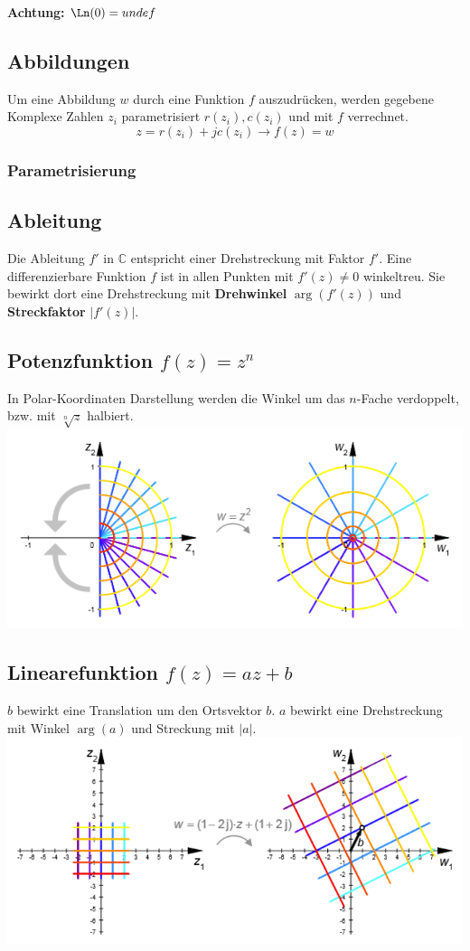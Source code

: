 \noindent\textbf{Achtung:} $\Ln(0) = undef$


\subsection{Abbildungen}
Um eine Abbildung $w$ durch eine Funktion $f$ auszudrücken, werden gegebene Komplexe Zahlen $z_i$ parametrisiert $r(z_i), c(z_i)$ und mit $f$ verrechnet.
\[z = r(z_i) + jc(z_i) \rightarrow f(z) = w \]

\subsubsection{Parametrisierung}
\todo{}

\subsection{Ableitung}
Die Ableitung $f'$ in $\mathbb{C}$ entspricht einer Drehstreckung mit Faktor $f'$. Eine differenzierbare Funktion $f$ ist in allen Punkten mit $f'(z) \neq 0$ winkeltreu. Sie bewirkt dort eine Drehstreckung mit \textbf{Drehwinkel} $\arg(f'(z))$ und \textbf{Streckfaktor} $|f'(z)|$.

\subsection{Potenzfunktion $f(z) = z^n$}
In Polar-Koordinaten Darstellung werden die Winkel um das $n$-Fache verdoppelt, bzw. mit $\sqrt[n]{z}$ halbiert.
\includegraphics[width=\columnwidth]{Images/quadrat_funktion}

\subsection{Linearefunktion $f(z) = az + b$}
$b$ bewirkt eine Translation um den Ortsvektor $b$. $a$ bewirkt eine Drehstreckung mit Winkel $\arg(a)$ und Streckung mit $|a|$.
\includegraphics[width=\columnwidth]{Images/lineare_funktion}

